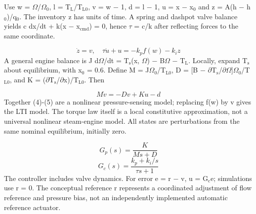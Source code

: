 \documentclass[conference]{IEEEtran}
\begin{document}
Use w = \ensuremath{\Omega}/\ensuremath{\Omega}\ensuremath{{}_0}, l = T\ensuremath{_{\mathrm{L}}}/T\ensuremath{_{\mathrm{L0}}}, v = w \ensuremath{-} 1, d = l \ensuremath{-} 1, u = x \ensuremath{-} x\ensuremath{{}_0} and z = A(h \ensuremath{-} h\ensuremath{{}_0})/q\ensuremath{{}_0}. The inventory z has units of time. A spring and dashpot valve balance yields c dx/dt + k(x \ensuremath{-} x\ensuremath{_{\mathrm{cmd}}}) = 0, hence \ensuremath{\tau} = c/k after reflecting forces to the same coordinate.

\begin{equation}\dot z=v,\quad \tau\dot u+u=-k_p f(w)-k_i z\end{equation}
A general engine balance is J d\ensuremath{\Omega}/dt = T\ensuremath{_{\mathrm{s}}}(x, \ensuremath{\Omega}) \ensuremath{-} B\ensuremath{\Omega} \ensuremath{-} T\ensuremath{_{\mathrm{L}}}. Locally, expand T\ensuremath{_{\mathrm{s}}} about equilibrium, with x\ensuremath{{}_0} = 0.6. Define M = J\ensuremath{\Omega}\ensuremath{{}_0}/T\ensuremath{_{\mathrm{L0}}}, D = [B \ensuremath{-} \ensuremath{\partial}T\ensuremath{_{\mathrm{s}}}/\ensuremath{\partial}\ensuremath{\Omega}]\ensuremath{\Omega}\ensuremath{{}_0}/T\ensuremath{_{\mathrm{L0}}}, and K = (\ensuremath{\partial}T\ensuremath{_{\mathrm{s}}}/\ensuremath{\partial}x)/T\ensuremath{_{\mathrm{L0}}}. Then

\begin{equation}M\dot v=-Dv+Ku-d\end{equation}
Together (4)-(5) are a nonlinear pressure-sensing model; replacing f(w) by v gives the LTI model. The torque law itself is a local constitutive approximation, not a universal nonlinear steam-engine model. All states are perturbations from the same nominal equilibrium, initially zero.

\begin{equation}G_p(s)=\frac{K}{Ms+D}\end{equation}
\begin{equation}G_c(s)=\frac{k_p+k_i/s}{\tau s+1}\end{equation}
The controller includes valve dynamics. For error e = r \ensuremath{-} v, u = G\ensuremath{_{\mathrm{c}}}e; simulations use r = 0. The conceptual reference r represents a coordinated adjustment of flow reference and pressure bias, not an independently implemented automatic reference actuator.
\end{document}

